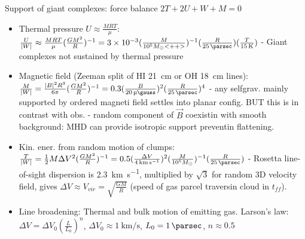 \begin{frame}{Support of giant complexes: force balance $2T+2U+W+M=0$}
    \begin{itemize}
        \item Thermal pressure $U\approx \frac{MRT}{\mu}$: $\frac{U}{|W|}\approx \frac{MRT}{\mu}(\frac{GM^2}{R})^{-1}=\num{3e-3}(\frac{M}{\num{e5}\msun{}<++>})^{-1}(\frac{R}{\SI{25}{\parsec}})(\frac{T}{\SI{15}{\kelvin}})$ - Giant complexes not sustained by thermal pressure
        \item Magnetic field (Zeeman split of HI \SI{21}{\cm} or OH \SI{18}{\cm} lines): $\frac{M}{|W|}=\frac{|B|^2R^3}{6\pi}(\frac{GM^2}{R})^{-1}=0.3(\frac{B}{\SI{20}{\micro\gauss}})^2(\frac{R}{\SI{25}{\parsec}})^4$ - any selfgrav. mainly supported by ordered magneti field settles into planar config. BUT this is in contrast with obs. - random component of $\vec{B}$ coexistin with smooth background: MHD can provide isotropic support preventin flattening.
        \item Kin. ener. from random motion of clumps: $\frac{T}{|W|}=\frac{1}{2}M\Delta V^2(\frac{GM^2}{R})^{-1}=0.5(\frac{\Delta V}{\SI{4}{\kilo\meter\per\second}})^2(\frac{M}{\num{e5}\msun{}})^{-1}(\frac{R}{\SI{25}{\parsec}})$ - Rosetta line-of-sight dispersion is \SI{2.3}{\kilo\meter\per\second}, multiplied by $\sqrt{3}$ for random 3D velocity field, gives $\Delta V\approx V_{vir}=\sqrt{\frac{GM}{R}}$ (speed of gas parcel traversin cloud in $t_{ff}$).
        \item Line broadening: Thermal and bulk motion of emitting gas. Larson's law: $\Delta V=\Delta V_0(\frac{L}{L_0})^n$, $\Delta V_0\approx\SI{1}{\kilo\meter\per\second}$, $L_0=\SI{1}{\parsec}$, $n\approx0.5$
        \end{itemize}
\end{frame}

